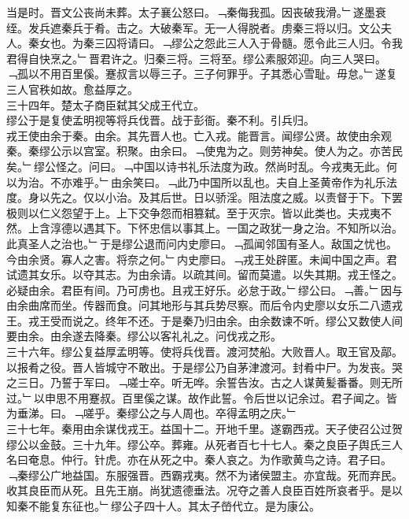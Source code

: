 \documentclass{zhvt-classic}
\begin{document}
\hspace*{2em}当是时。晋文公丧尚未葬。太子襄公怒曰。﹁秦侮我孤。因丧破我滑。﹂遂墨衰绖。发兵遮秦兵于肴。击之。大破秦军。无一人得脱者。虏秦三将以归。文公夫人。秦女也。为秦三囚将请曰。﹁缪公之怨此三人入于骨髓。愿令此三人归。令我君得自快烹之。﹂晋君许之。归秦三将。三将至。缪公素服郊迎。向三人哭曰。﹁孤以不用百里傒。蹇叔言以辱三子。三子何罪乎。子其悉心雪耻。毋怠。﹂遂复三人官秩如故。愈益厚之。\\
\hspace*{2em}三十四年。楚太子商臣弑其父成王代立。\\
\hspace*{2em}缪公于是复使孟明视等将兵伐晋。战于彭衙。秦不利。引兵归。\\
\hspace*{2em}戎王使由余于秦。由余。其先晋人也。亡入戎。能晋言。闻缪公贤。故使由余观秦。秦缪公示以宫室。积聚。由余曰。﹁使鬼为之。则劳神矣。使人为之。亦苦民矣。﹂缪公怪之。问曰。﹁中国以诗书礼乐法度为政。然尚时乱。今戎夷无此。何以为治。不亦难乎。﹂由余笑曰。﹁此乃中国所以乱也。夫自上圣黄帝作为礼乐法度。身以先之。仅以小治。及其后世。日以骄淫。阻法度之威。以责督于下。下罢极则以仁义怨望于上。上下交争怨而相篡弑。至于灭宗。皆以此类也。夫戎夷不然。上含淳德以遇其下。下怀忠信以事其上。一国之政犹一身之治。不知所以治。此真圣人之治也。﹂于是缪公退而问内史廖曰。﹁孤闻邻国有圣人。敌国之忧也。今由余贤。寡人之害。将奈之何。﹂内史廖曰。﹁戎王处辟匿。未闻中国之声。君试遗其女乐。以夺其志。为由余请。以疏其间。留而莫遣。以失其期。戎王怪之。必疑由余。君臣有间。乃可虏也。且戎王好乐。必怠于政。﹂缪公曰。﹁善。﹂因与由余曲席而坐。传器而食。问其地形与其兵势尽察。而后令内史廖以女乐二八遗戎王。戎王受而说之。终年不还。于是秦乃归由余。由余数谏不听。缪公又数使人间要由余。由余遂去降秦。缪公以客礼礼之。问伐戎之形。\\
\hspace*{2em}三十六年。缪公复益厚孟明等。使将兵伐晋。渡河焚船。大败晋人。取王官及鄗。以报肴之役。晋人皆城守不敢出。于是缪公乃自茅津渡河。封肴中尸。为发丧。哭之三日。乃誓于军曰。﹁嗟士卒。听无哗。余誓告汝。古之人谋黄髪番番。则无所过。﹂以申思不用蹇叔。百里傒之谋。故作此誓。令后世以记余过。君子闻之。皆为垂涕。曰。﹁嗟乎。秦缪公之与人周也。卒得孟明之庆。﹂\\
\hspace*{2em}三十七年。秦用由余谋伐戎王。益国十二。开地千里。遂霸西戎。天子使召公过贺缪公以金鼓。三十九年。缪公卒。葬雍。从死者百七十七人。秦之良臣子舆氏三人名曰奄息。仲行。针虎。亦在从死之中。秦人哀之。为作歌黄鸟之诗。君子曰。﹁秦缪公广地益国。东服强晋。西霸戎夷。然不为诸侯盟主。亦宜哉。死而弃民。收其良臣而从死。且先王崩。尚犹遗德垂法。况夺之善人良臣百姓所哀者乎。是以知秦不能复东征也。﹂缪公子四十人。其太子嵤代立。是为康公。\\
\end{document}
